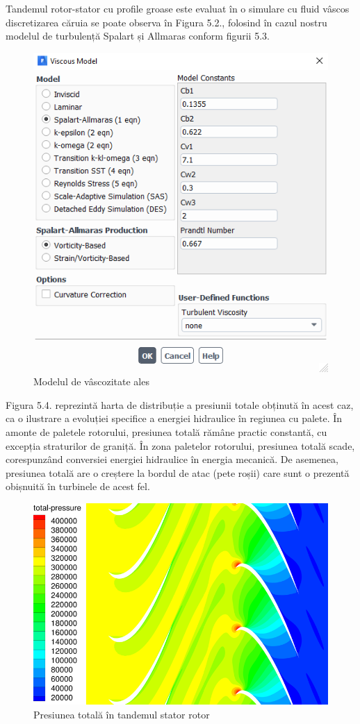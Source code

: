 Tandemul rotor-stator cu profile groase este evaluat în o simulare cu fluid vâscos discretizarea căruia se poate observa în Figura 5.2., folosind în cazul nostru modelul de turbulență Spalart și Allmaras \cite{spalart1992one} conform figurii 5.3.

\begin{figure}
	\centering
	\includegraphics[scale=0.7]{figures/tandem_thick_viscous_model.PNG}
	\caption{Modelul de vâscozitate ales}
	\label{Modelul de vâscozitate ales}
\end{figure}

Figura 5.4. reprezintă harta de distribuție a presiunii totale obținută în acest caz, ca o ilustrare a evoluției specifice a energiei hidraulice în regiunea cu palete. În amonte de paletele rotorului, presiunea totală rămâne practic constantă, cu excepția straturilor de graniță. În zona paletelor rotorului, presiunea totală scade, corespunzând conversiei energiei hidraulice în energia mecanică. De asemenea, presiunea totală are o creștere la bordul de atac (pete roșii) care sunt o prezentă obișnuită în turbinele de acest fel.

\begin{figure}
	\centering
	\includegraphics[scale=1]{figures/presiunea-totala.png}
	\caption{Presiunea totală în tandemul stator rotor}
	\label{Presiunea totală în tandemul stator rotor}
\end{figure}